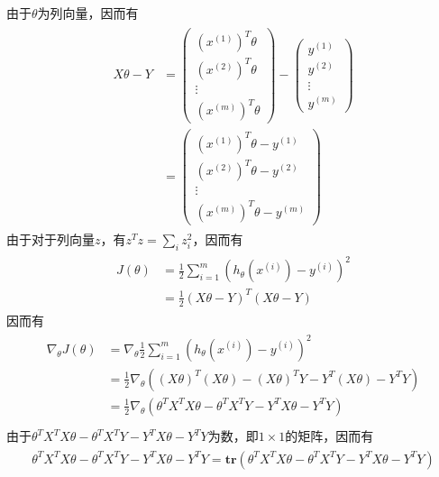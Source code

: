 由于$\theta$为列向量，因而有
\begin{eqnarray}
\begin{aligned}
X\theta-Y
&=
\begin{pmatrix}
(x^{(1)})^T\theta\\
(x^{(2)})^T\theta\\
\vdots\\
(x^{(m)})^T\theta
\end{pmatrix}
-
\begin{pmatrix}
y^{(1)}\\
y^{(2)}\\
\vdots\\
y^{(m)}
\end{pmatrix}\\
&=
\begin{pmatrix}
(x^{(1)})^T\theta-y^{(1)}\\
(x^{(2)})^T\theta-y^{(2)}\\
\vdots\\
(x^{(m)})^T\theta-y^{(m)}
\end{pmatrix}
\end{aligned}
\end{eqnarray}
由于对于列向量$z$，有$z^Tz=\sum_iz_i^2$，因而有
\begin{eqnarray}
\begin{aligned}
J(\theta)&=\frac{1}{2}\sum_{i=1}^m(h_\theta(x^{(i)})-y^{(i)})^2\\
&= \frac{1}{2}(X\theta-Y)^T(X\theta-Y)\end{aligned}
\end{eqnarray}
因而有
\begin{eqnarray}
\begin{aligned}
\nabla_\theta J(\theta)&=\nabla_\theta\frac{1}{2}\sum_{i=1}^m(h_\theta(x^{(i)})-y^{(i)})^2\\
&=\frac{1}{2}\nabla_\theta((X\theta)^T(X\theta)-(X\theta)^TY-Y^T(X\theta)-Y^TY)\\
&=\frac{1}{2}\nabla_\theta(\theta^TX^TX\theta-\theta^TX^TY-Y^TX\theta-Y^TY)\\\end{aligned}
\end{eqnarray}
由于$\theta^TX^TX\theta-\theta^TX^TY-Y^TX\theta-Y^TY$为数，即$1\times1$的矩阵，因而有
\begin{eqnarray}
\begin{aligned}
\theta^TX^TX\theta-\theta^TX^TY-Y^TX\theta-Y^TY=\textbf{tr}(\theta^TX^TX\theta-\theta^TX^TY-Y^TX\theta-Y^TY)
\end{aligned}
\end{eqnarray}
